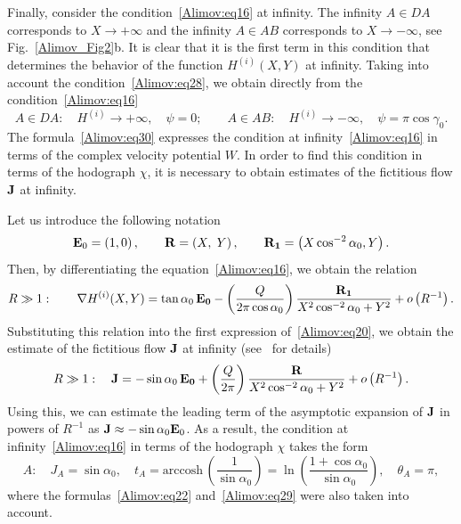 \documentclass[
11pt,%
tightenlines,%
twoside,%
onecolumn,%
nofloats,%
nobibnotes,%
nofootinbib,%
superscriptaddress,%
noshowpacs,%
centertags]%
{revtex4-2}
\begin{document}
Finally, consider the condition~\eqref{Alimov:eq16} at infinity. The infinity $A \in DA$
corresponds to $X \to + \infty$ and the infinity $A \in AB$ corresponds to $X \to - \infty $, see
Fig.~\ref{Alimov_Fig2}b. It is clear that it is the first term in this condition that determines
the behavior of the function $H^{(i)}(X,Y)$ at infinity. Taking into account the
condition~\eqref{Alimov:eq28}, we obtain directly from the condition~\eqref{Alimov:eq16}
\begin{equation}
\label{Alimov:eq30} A \in DA: \quad  H^{(i)} \to + \infty,\quad \psi = 0;\quad \quad A \in AB:\quad
H^{(i)} \to - \infty,\quad \psi = \pi \cos \gamma_0 .
\end{equation}
The formula~\eqref{Alimov:eq30} expresses the condition at infinity~\eqref{Alimov:eq16} in terms of
the complex velocity potential $W$. In order to find this condition in terms of the hodograph
$\chi$, it is necessary to obtain estimates of the fictitious flow ${\rm {\bf J}}$ at infinity.

Let us introduce the following notation
\[
{\rm {\bf E}}_0 = \left( {1, 0} \right),\quad \quad {\rm {\bf R}} = \left( {X,\;Y} \right), \quad
\quad {\rm {\bf R}}_{\rm {\bf 1}} = \left( {X\cos^{-2}\alpha_0, Y} \right).
\]
Then, by differentiating the equation~\eqref{Alimov:eq16}, we obtain the relation
\[
R \gg 1:\quad \quad \nabla H^{(i)}(X,Y) = \tan \alpha_0 \,{\rm {\bf E}}_{\rm {\bf 0}} - \left(
{\frac{Q}{2\pi \cos \alpha_0 }} \right)\frac{{\rm {\bf R}}_{\rm {\bf 1}} } {X^2\cos^{-2}\alpha_0 +
Y^2} + o\left( R^{-1} \right).
\]
Substituting this relation into the first expression of~\eqref{Alimov:eq20}, we obtain the estimate
of the fictitious flow ${\rm {\bf J}}$ at infinity (see~\cite{Alimov:bib9} for details)
\[
R \gg 1: \quad {\rm {\bf J}} = - \sin \alpha_0 \,{\rm {\bf E}}_{\rm {\bf 0}} + \left(
{\frac{Q}{2\pi}} \right)\frac{{\rm {\bf R}}}{X^2\cos^{-2}\alpha_0 + Y^2} + o\left( {R^{-1}}
\right).
\]
Using this, we can estimate the leading term of the asymptotic expansion of ${\rm {\bf J}}$ in
powers of $R^{-1}$ as ${\rm {\bf J}} \approx - \sin \alpha_0 {\rm {\bf E}}_0$. As a result, the
condition at infinity~\eqref{Alimov:eq16} in terms of the hodograph $\chi$ takes the form
\begin{equation}
\label{Alimov:eq31} A: \quad J_A = \sin \alpha_0, \quad t_A = \mbox{arccosh}\, \left(
{\frac{1}{\sin \alpha_0 }} \right) = \ln \left( {\frac{1 + \cos \alpha_0 }{\sin \alpha_0}} \right),
\quad \theta_A = \pi,
\end{equation}
where the formulas~\eqref{Alimov:eq22} and~\eqref{Alimov:eq29} were also taken into
account.
\end{document}

